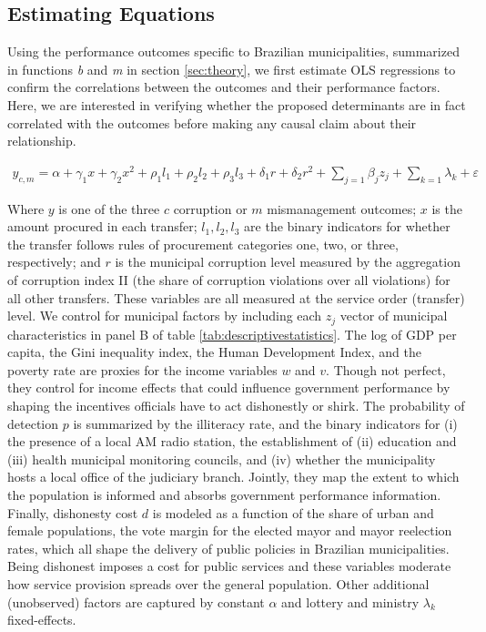\documentclass[11pt]{article}
\begin{document}
\subsection{Estimating Equations} \label{subsec:equations}

Using the performance outcomes specific to Brazilian municipalities, summarized in functions \emph{b} and \emph{m} in section \ref{sec:theory}, we first estimate OLS regressions to confirm the correlations between the outcomes and their performance factors. Here, we are interested in verifying whether the proposed determinants are in fact correlated with the outcomes before making any causal claim about their relationship.

\begin{equation} \label{eq:mainregression}
  \begin{aligned}
    y_{c,m} = \alpha + \gamma_{1}x + \gamma_{2}x^{2} + \rho_{1}l_{1} + \rho_{2}l_{2} + \rho_{3}l_{3} + \delta_{1}r + \delta_{2}r^{2} + \sum_{j = 1} \beta_{j} z_{j} + \sum_{k = 1} \lambda_{k} + \varepsilon %
  \end{aligned}
\end{equation}

Where $y$ is one of the three $c$ corruption or $m$ mismanagement outcomes; $x$ is the amount procured in each transfer; $l_{1}, l_{2}, l_{3}$ are the binary indicators for whether the transfer follows rules of procurement categories one, two, or three, respectively; and $r$ is the municipal corruption level measured by the aggregation of corruption index II (the share of corruption violations over all violations) for all other transfers. These variables are all measured at the service order (transfer) level. We control for municipal factors by including each $z_{j}$ vector of municipal characteristics in panel B of table \ref{tab:descriptivestatistics}. The log of GDP per capita, the Gini inequality index, the Human Development Index, and the poverty rate are proxies for the income variables $w$ and $v$. Though not perfect, they control for income effects that could influence government performance by shaping the incentives officials have to act dishonestly or shirk. The probability of detection $p$ is summarized by the illiteracy rate, and the binary indicators for (i) the presence of a local AM radio station, the establishment of (ii) education and (iii) health municipal monitoring councils, and (iv) whether the municipality hosts a local office of the judiciary branch. Jointly, they map the extent to which the population is informed and absorbs government performance information. Finally, dishonesty cost $d$ is modeled as a function of the share of urban and female populations, the vote margin for the elected mayor and mayor reelection rates, which all shape the delivery of public policies in Brazilian municipalities. Being dishonest imposes a cost for public services and these variables moderate how service provision spreads over the general population. Other additional (unobserved) factors are captured by constant $\alpha$ and lottery and ministry $\lambda_{k}$ fixed-effects.
\end{document}
